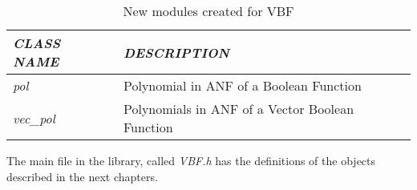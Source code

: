 \begin{table}[htbp]%
\caption{New modules created for VBF\label{tab:NewModules}}{%
\begin{tabular}{|l|l|}
\hline
\em{CLASS NAME} & \em{DESCRIPTION} \\\hline
\textsl{pol} & Polynomial in ANF of a Boolean Function \\\hline
\textsl{vec\_pol} & Polynomials in ANF of a Vector Boolean Function \\\hline
\end{tabular}}
\end{table}%

The main file in the library, called \textsl{VBF.h} has the definitions
of the objects described in the next chapters.



